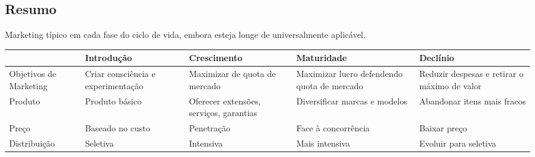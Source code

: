 \documentclass[11pt]{article}
\begin{document}
\subsection*{Resumo}

Marketing típico em cada fase do ciclo de vida, embora esteja longe de universalmente aplicável.

\begin{tabular}{ C{2.1cm} | C{3.3cm} | C{3.3cm} | C{3.3cm} | C{3.3cm} }
                           & Introdução                                                                                                                 & Crescimento                                                                          & Maturidade                                                                                                            & Declínio                                                                \\\hline
    Objetivos de Marketing & Criar consciência e experimentação                                                                                         & Maximizar de quota de mercado                                                        & Maximizar lucro defendendo quota de mercado                                                                           & Reduzir despesas e retirar o máximo de valor                            \\\hline
    Produto                & Produto básico                                                                                                             & Oferecer extensões, serviços, garantias                                              & Diversificar marcas e modelos                                                                                         & Abandonar itens mais fracos                                             \\\hline
    Preço                  & Baseado no custo                                                                                                           & Penetração                                                                           & Face à concorrência                                                                                                   & Baixar preço                                                            \\\hline
    Distribuição           & Seletiva                                                                                                                   & Intensiva                                                                            & Mais intensiva                                                                                                        & Evoluir para seletiva                                                   \\\hline

\end{tabular}
\end{document}
